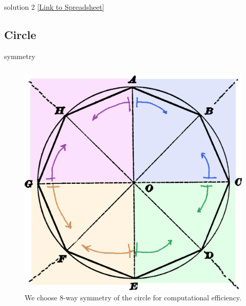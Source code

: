 \documentclass[aspectratio=169,xcolor={dvipsnames,svgnames}]{beamer}
\begin{document}
\begin{frame}[label={sec:orgbc5d11b}]{solution 2}
\centering
\href{https://docs.google.com/spreadsheets/d/13s1unOAzBQmYA4SF9ifBtw02AEAUlfRTaOvl4m2cbEc/edit?usp=sharing}{[Link to Spreadsheet]​}
\end{frame}
\subsection{Circle}
\label{sec:org3da17fa}


\begin{frame}[label={sec:orgc1a5ebb}]{symmetry}
\begin{columns}
\begin{column}{.45\columnwidth}
\begin{figure}[htbp]
\centering
\includegraphics[width=.9\linewidth]{images/circle-8way.png}
\caption{We choose 8-way symmetry of the circle for computational efficiency.}
\end{figure}
\end{column}
\end{columns}
\end{frame}
\end{document}
